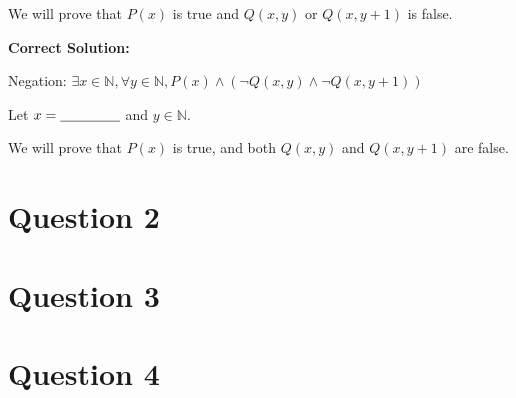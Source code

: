 \documentclass[12pt]{article}
\begin{document}
\begin{enumerate}[a.]
    We will prove that $P(x)$ is true and $Q(x,y)$ or $Q(x, y+1)$ is false.

    \bigskip

    \textbf{Correct Solution:}

    Negation: $\exists x \in \mathbb{N}, \forall y \in \mathbb{N}, P(x) \land
    (\neg Q(x,y) \land \neg Q(x,y+1))$

    \bigskip

    Let $x = \underline{\hspace{1.5cm}}$ and $y \in \mathbb{N}$.

    We will prove that $P(x)$ is true, and both $Q(x,y)$ and $Q(x,y+1)$ are false.

\end{enumerate}

\section*{Question 2}

\section*{Question 3}

\section*{Question 4}
\end{document}
